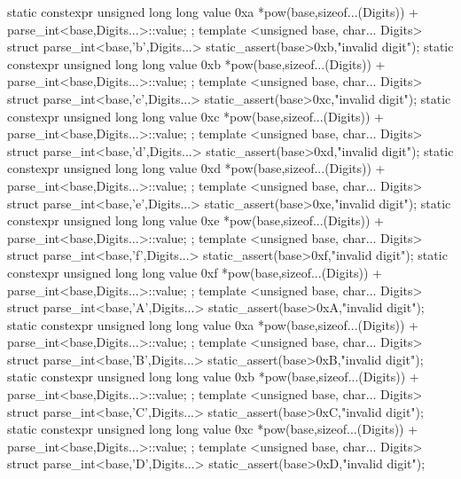 \documentclass[ebook,11pt,article]{memoir}
\begin{document}
\begin{codeblock}
{{{    static constexpr unsigned long long value{ 0xa *pow(base,sizeof...(Digits))
                                               + parse_int<base,Digits...>::value};
};
template <unsigned base, char... Digits>
struct parse_int<base,'b',Digits...>{
    static_assert(base>0xb,"invalid digit");
    static constexpr unsigned long long value{ 0xb *pow(base,sizeof...(Digits))
                                               + parse_int<base,Digits...>::value};
};
template <unsigned base, char... Digits>
struct parse_int<base,'c',Digits...>{
    static_assert(base>0xc,"invalid digit");
    static constexpr unsigned long long value{ 0xc *pow(base,sizeof...(Digits))
                                               + parse_int<base,Digits...>::value};
};
template <unsigned base, char... Digits>
struct parse_int<base,'d',Digits...>{
    static_assert(base>0xd,"invalid digit");
    static constexpr unsigned long long value{ 0xd *pow(base,sizeof...(Digits))
                                               + parse_int<base,Digits...>::value};
};
template <unsigned base, char... Digits>
struct parse_int<base,'e',Digits...>{
    static_assert(base>0xe,"invalid digit");
    static constexpr unsigned long long value{ 0xe *pow(base,sizeof...(Digits))
                                               + parse_int<base,Digits...>::value};
};
template <unsigned base, char... Digits>
struct parse_int<base,'f',Digits...>{
    static_assert(base>0xf,"invalid digit");
    static constexpr unsigned long long value{ 0xf *pow(base,sizeof...(Digits))
                                               + parse_int<base,Digits...>::value};
};
template <unsigned base, char... Digits>
struct parse_int<base,'A',Digits...>{
    static_assert(base>0xA,"invalid digit");
    static constexpr unsigned long long value{ 0xa *pow(base,sizeof...(Digits))
                                               + parse_int<base,Digits...>::value};
};
template <unsigned base, char... Digits>
struct parse_int<base,'B',Digits...>{
    static_assert(base>0xB,"invalid digit");
    static constexpr unsigned long long value{ 0xb *pow(base,sizeof...(Digits))
                                               + parse_int<base,Digits...>::value};
};
template <unsigned base, char... Digits>
struct parse_int<base,'C',Digits...>{
    static_assert(base>0xC,"invalid digit");
    static constexpr unsigned long long value{ 0xc *pow(base,sizeof...(Digits))
                                               + parse_int<base,Digits...>::value};
};
template <unsigned base, char... Digits>
struct parse_int<base,'D',Digits...>{
    static_assert(base>0xD,"invalid digit");
}}}
\end{codeblock}
\end{document}
